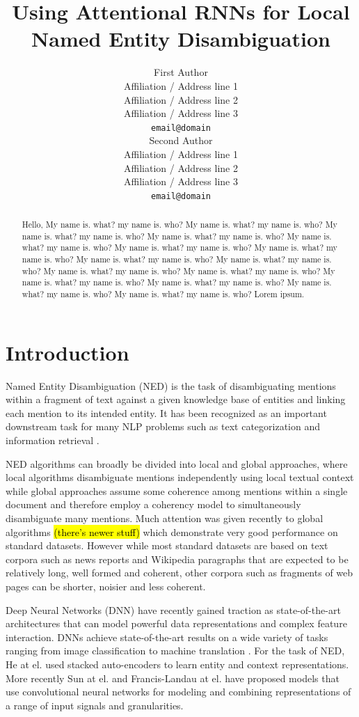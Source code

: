 \documentclass[11pt]{article}
\title{Using Attentional RNNs for Local Named Entity Disambiguation}
\author{First Author \\
	Affiliation / Address line 1 \\
	Affiliation / Address line 2 \\
	Affiliation / Address line 3 \\
	{\tt email@domain} \\\And
	Second Author \\
	Affiliation / Address line 1 \\
	Affiliation / Address line 2 \\
	Affiliation / Address line 3 \\
	{\tt email@domain} \\}
\date{}
\begin{document}
	\maketitle
	\begin{abstract}
		Hello, My name is. what? my name is. who?
		My name is. what? my name is. who?
		My name is. what? my name is. who?
		My name is. what? my name is. who?
		My name is. what? my name is. who?
		My name is. what? my name is. who?
		My name is. what? my name is. who?
		My name is. what? my name is. who?
		My name is. what? my name is. who?
		My name is. what? my name is. who?
		My name is. what? my name is. who?
		My name is. what? my name is. who?
		My name is. what? my name is. who?
		My name is. what? my name is. who?
		My name is. what? my name is. who? Lorem ipsum.
	\end{abstract}
	
	\section{Introduction}
	
	Named Entity Disambiguation (NED) is the task of disambiguating mentions within a fragment of text against a given knowledge base of entities and linking each mention to its intended entity. It has been recognized as an important downstream task for many NLP problems such as text categorization \cite{gabrilovich2007computing} and information retrieval \cite{dalton2014entity}. 
	
	NED algorithms can broadly be divided into local and global approaches, where local algorithms disambiguate mentions independently using local textual context while global approaches assume some coherence among mentions within a single document and therefore employ a coherency model to simultaneously disambiguate many mentions. Much attention was given recently to global algorithms \cite{ratinov2011local,guo2014entity,pershina2015personalized} \hl{(there's newer stuff)} which demonstrate very good performance on standard datasets. However while most standard datasets are based on text corpora such as news reports and Wikipedia paragraphs that are expected to be relatively long, well formed and coherent, other corpora such as fragments of web pages can be shorter, noisier and less coherent.
	
	Deep Neural Networks (DNN) have recently gained traction as state-of-the-art architectures that can model powerful data representations and complex feature interaction. DNNs achieve state-of-the-art results on a wide variety of tasks ranging from image classification \cite{krizhevsky2012imagenet} to machine translation \cite{bahdanau2014neural}. For the task of NED, He at el.  used stacked auto-encoders to learn entity and context representations. More recently Sun at el. and Francis-Landau at el.  have proposed models that use convolutional neural networks for modeling and combining representations of a range of input signals and granularities. 
	
\end{document}
